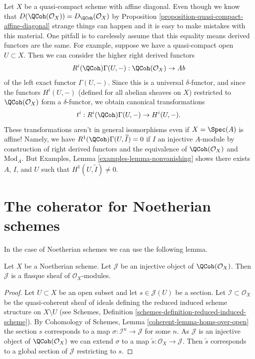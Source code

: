 \begin{remark}[Warning]
\label{remark-warning-coherator}
Let $X$ be a quasi-compact scheme with affine diagonal. Even though we know
that $D(\QCoh(\mathcal{O}_X)) = D_\QCoh(\mathcal{O}_X)$ by
Proposition \ref{proposition-quasi-compact-affine-diagonal}
strange things can
happen and it is easy to make mistakes with this material. One pitfall
is to carelessly assume that this equality means derived functors are the same.
For example, suppose we have a quasi-compact open $U \subset X$. Then we can
consider the higher right derived functors
$$
R^i(\QCoh)\Gamma(U, -) : \QCoh(\mathcal{O}_X) \to \textit{Ab}
$$
of the left exact functor $\Gamma(U, -)$. Since this is a universal
$\delta$-functor, and since the functors $H^i(U, -)$ (defined for all
abelian sheaves on $X$) restricted to $\QCoh(\mathcal{O}_X)$ form
a $\delta$-functor, we obtain canonical transformations
$$
t^i : R^i(\QCoh)\Gamma(U, -) \to H^i(U, -).
$$
These transformations aren't in general isomorphisms even if $X = \Spec(A)$
is affine! Namely, we have $R^1(\QCoh)\Gamma(U, \widetilde{I}) = 0$
if $I$ an injective $A$-module by construction of right derived functors
and the equivalence of $\QCoh(\mathcal{O}_X)$ and $\text{Mod}_A$.
But Examples, Lemma \ref{examples-lemma-nonvanishing}
shows there exists $A$, $I$, and $U$ such that
$H^1(U, \widetilde{I}) \not = 0$.
\end{remark}




\section{The coherator for Noetherian schemes}
\label{section-coherator-Noetherian}

\noindent
In the case of Noetherian schemes we can use the following lemma.

\begin{lemma}
\label{lemma-injective-quasi-coherent-sheaf-Noetherian}
Let $X$ be a Noetherian scheme. Let $\mathcal{J}$ be an injective
object of $\QCoh(\mathcal{O}_X)$. Then $\mathcal{J}$
is a flasque sheaf of $\mathcal{O}_X$-modules.
\end{lemma}

\begin{proof}
Let $U \subset X$ be an open subset and let $s \in \mathcal{J}(U)$ be a section.
Let $\mathcal{I} \subset \mathcal{O}_X$ be the quasi-coherent sheaf
of ideals defining the reduced induced scheme structure on $X \setminus U$
(see Schemes, Definition \ref{schemes-definition-reduced-induced-scheme}).
By Cohomology of Schemes, Lemma \ref{coherent-lemma-homs-over-open}
the section $s$ corresponds to a map $\sigma : \mathcal{I}^n \to \mathcal{J}$
for some $n$. As $\mathcal{J}$ is an injective object of
$\QCoh(\mathcal{O}_X)$ we can extend $\sigma$ to a map
$\tilde s : \mathcal{O}_X \to \mathcal{J}$. Then $\tilde s$ corresponds
to a global section of $\mathcal{J}$ restricting to $s$.
\end{proof}

